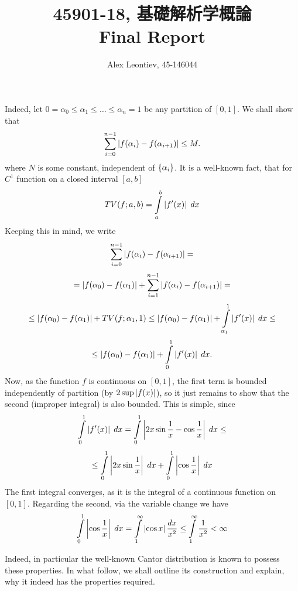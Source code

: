 \documentclass[10pt]{article} %
\title{45901-18, 基礎解析学概論\\Final Report}
\author{Alex Leontiev, 45-146044}
\begin{document}
\begin{CJK}{UTF8}{bsmi}
\maketitle
\end{CJK}
\begin{enumerate}[\bf{[}1{]}]
	\item Indeed, let $0=\alpha_0\leq\alpha_1\leq\hdots\leq\alpha_n=1$ be any partition of $[0,1]$. We shall show that
		\[\sum_{i=0}^{n-1}\myabs{f(\alpha_i)-f(\alpha_{i+1})}\leq M.\]
		where $N$ is some constant, independent of $\left\{\alpha_i\right\}$. It is a well-known fact, that for $C^1$ function
		on a closed interval $[a,b]$
		\[TV(f;a,b)=\int_a^b\myabs{f'(x)}\;dx\]
		Keeping this in mind, we write
		\[\sum_{i=0}^{n-1}\myabs{f(\alpha_i)-f(\alpha_{i+1})}=\]
		\[=\myabs{f(\alpha_0)-f(\alpha_1)}+\sum_{i=1}^{n-1}\myabs{f(\alpha_i)-f(\alpha_{i+1})}=\]
		\[\leq\myabs{f(\alpha_0)-f(\alpha_1)}+TV(f;\alpha_1,1)
		\leq\myabs{f(\alpha_0)-f(\alpha_1)}+\int_{\alpha_1}^1\myabs{f'(x)}\;dx\leq\]
		\[\leq\myabs{f(\alpha_0)-f(\alpha_1)}+\int_0^1\myabs{f'(x)}\;dx.\]
		Now, as the function $f$ is continuous on $[0,1]$, the first term is bounded independently of partition (by $2\sup
		\myabs{f(x)}$), so it just remains to show that the second (improper integral) is also bounded. This is simple, since
		\[\int_0^1\myabs{f'(x)}\;dx=\int_0^1\myabs{2x\sin\frac{1}{x}-\cos\frac{1}{x}}\;dx\leq\]
		\[\leq\int_0^1\myabs{2x\sin\frac{1}{x}}\;dx+\int_0^1\myabs{\cos\frac{1}{x}}\;dx\]
		The first integral converges, as it is the integral of a continuous function on $[0,1]$. Regarding the second,
		via the variable change we have
		\[\int_0^1\myabs{\cos\frac{1}{x}}\;dx=\int_1^{\infty}\myabs{\cos x}\frac{dx}{x^2}\leq\int_1^{\infty}\frac{1}{x^2}
		<\infty\]
	\item Indeed, in particular the well-known Cantor distribution is known to possess these properties. In what follow,
		we shall outline its construction and explain, why it indeed has the properties required.


\end{enumerate}
\end{document}
